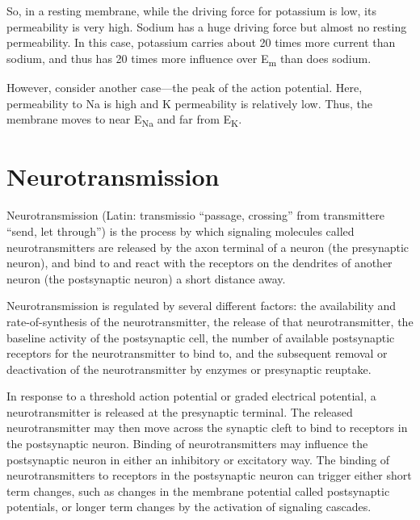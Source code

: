 So, in a resting membrane, while the driving force for potassium is low, its permeability is very high. Sodium has a huge driving force but almost no resting permeability. In this case, potassium carries about 20 times more current than sodium, and thus has 20 times more influence over E\textsubscript{m} than does sodium.

However, consider another case---the peak of the action potential. Here, permeability to Na is high and K permeability is relatively low. Thus, the membrane moves to near E\textsubscript{Na} and far from E\textsubscript{K}.

\hypertarget{neurotransmission}{%
\chapter{Neurotransmission}\label{neurotransmission}}

Neurotransmission (Latin: transmissio ``passage, crossing'' from transmittere ``send, let through'') is the process by which signaling molecules called neurotransmitters are released by the axon terminal of a neuron (the presynaptic neuron), and bind to and react with the receptors on the dendrites of another neuron (the postsynaptic neuron) a short distance away.

Neurotransmission is regulated by several different factors: the availability and rate-of-synthesis of the neurotransmitter, the release of that neurotransmitter, the baseline activity of the postsynaptic cell, the number of available postsynaptic receptors for the neurotransmitter to bind to, and the subsequent removal or deactivation of the neurotransmitter by enzymes or presynaptic reuptake.

In response to a threshold action potential or graded electrical potential, a neurotransmitter is released at the presynaptic terminal. The released neurotransmitter may then move across the synaptic cleft to bind to receptors in the postsynaptic neuron. Binding of neurotransmitters may influence the postsynaptic neuron in either an inhibitory or excitatory way. The binding of neurotransmitters to receptors in the postsynaptic neuron can trigger either short term changes, such as changes in the membrane potential called postsynaptic potentials, or longer term changes by the activation of signaling cascades.


